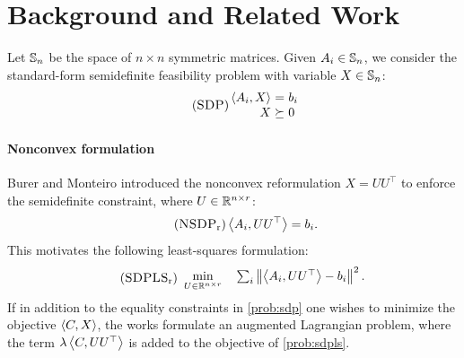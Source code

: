 \documentclass[final,onefignum,onetabnum]{siamart220329}
\begin{document}
\section{Background and Related Work}
\label{sec:background}
Let $\mathbb{S}_n$ be the space of $n \times n$ symmetric matrices.  Given
$A_i \in \mathbb{S}_n$, we consider the standard-form semidefinite feasibility problem
with variable $X \in \mathbb{S}_n$:
\begin{align} \label{prob:sdp} \tag{\textsc{SDP}}
  \arraycolsep=1.5pt
  \begin{array}{rcl}
    \dotp{A_i, X} &=& b_i \\
    X &\succeq& 0
  \end{array}
\end{align}


\paragraph{Nonconvex formulation}
  Burer and Monteiro \cite{Burernonlinearprogrammingalgorithm2003} introduced the
  nonconvex reformulation $X = UU^\top$ to enforce the semidefinite constraint,
  where $U \in \mathbb{R}^{n \times r}$:
  \begin{align}\label{prob:nsdp} \tag{\textsc{NSDP}\textsubscript{r}}
    \dotp{A_i, UU^\top} = b_i.
  \end{align}
  This motivates the following least-squares formulation:
  \begin{align} \label{prob:sdpls} \tag{\textsc{SDPLS}\textsubscript{r}}
    \begin{array}{ll}
      \displaystyle \min_{U \in \R^{n \times r}}\,& \sum_i \norm{\dotp{A_i, U U^\top} - b_i}^2.
    \end{array}
  \end{align}
  If in addition to the equality constraints in \eqref{prob:sdp} one wishes to
  minimize the objective $\left\langle C, X \right\rangle$, the works
  \cite{BurerLocalMinimaConvergence2005, bhojanapalli2018smoothed,
    CifuentesPolynomialtimeguarantees2019} formulate an augmented Lagrangian
  problem, where the term $\lambda \left\langle C, UU^\top \right\rangle$ is added to the objective
  of \eqref{prob:sdpls}.
\end{document}
